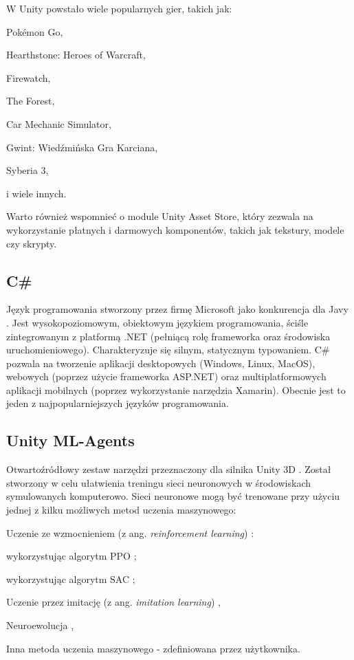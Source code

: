 W Unity powstało wiele popularnych gier, takich jak:
\begin{enumerate*}
\item Pokémon Go,
\item Hearthstone: Heroes of Warcraft,
\item Firewatch,
\item The Forest,
\item Car Mechanic Simulator,
\item Gwint: Wiedźmińska Gra Karciana,
\item Syberia 3,
\item i wiele innych.
\end{enumerate*}

Warto również wspomnieć o module Unity Asset Store, który zezwala na wykorzystanie płatnych i darmowych komponentów, takich jak tekstury, modele czy skrypty.

\subsection{C\#}
Język programowania stworzony przez firmę Microsoft jako konkurencja dla Javy \cite{csharp:opis}. Jest wysokopoziomowym, obiektowym językiem programowania, ściśle zintegrowanym z platformą .NET (pełniącą rolę frameworka oraz środowiska uruchomieniowego). Charakteryzuje się silnym, statycznym typowaniem. C\# pozwala na tworzenie aplikacji desktopowych (Windows, Linux, MacOS), webowych (poprzez użycie frameworka ASP.NET) oraz multiplatformowych aplikacji mobilnych (poprzez wykorzystanie narzędzia Xamarin). Obecnie jest to jeden z najpopularniejszych języków programowania.

\subsection{Unity ML-Agents}
Otwartoźródłowy zestaw narzędzi przeznaczony dla silnika Unity 3D \cite{unitymla:overview}. Został stworzony w celu ułatwienia treningu sieci neuronowych w środowiskach symulowanych komputerowo. Sieci neuronowe mogą być trenowane przy użyciu jednej z kilku możliwych metod uczenia maszynowego:
\begin{enumerate*}
\item Uczenie ze wzmocnieniem (z ang. \textit{reinforcement learning}) \cite{deepRL:guide}:
\begin{itemize*}
\item wykorzystując algorytm PPO \cite{ppo:opis};
\item wykorzystując algorytm SAC \cite{sac:opis};
\end{itemize*}
\item Uczenie przez imitację (z ang. \textit{imitation learning}) \cite{imitationLearning:article},
\item Neuroewolucja \cite{neuroevolution:primer},
\item Inna metoda uczenia maszynowego - zdefiniowana przez użytkownika.
\end{enumerate*}

